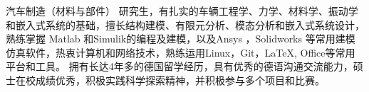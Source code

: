 \documentclass[zh]{resume}
\begin{document}
\makeheader


	{\onehalfspacing\hspace{2em}%
汽车制造（材料与部件） 研究生，有扎实的车辆工程学、力学、材料学、振动学和嵌入式系统的基础，擅长结构建模、有限元分析、模态分析和嵌入式系统设计，熟练掌握 Matlab 和Simulik的编程及建模，以及Ansys ，Solidworks 等常用建模仿真软件，热衷计算机和网络技术，熟练运用Linux，Git，\LaTeX , Office等常用平台和工具。
拥有长达4年多的德国留学经历，具有优秀的德语沟通交流能力，硕士在校成绩优秀，积极实践科学探索精神，并积极参与多个项目和比赛。
\par}


\end{document}
